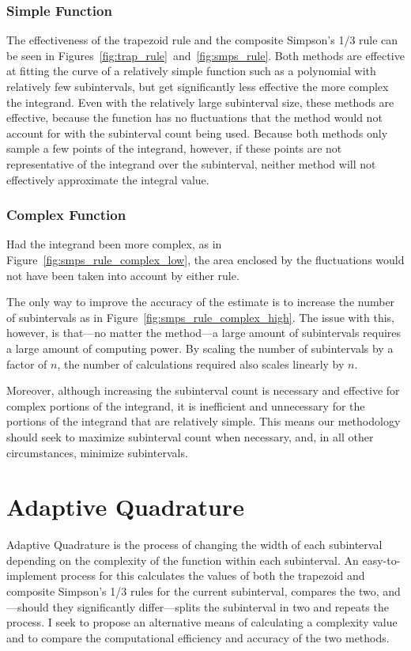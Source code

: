 \documentclass{paper}
\begin{document}
\subsubsection{Simple Function}
The effectiveness of the trapezoid rule and the composite Simpson's 1/3 rule can be seen in Figures~\ref{fig:trap_rule}~and~\ref{fig:smps_rule}.
Both methods are effective at fitting the curve of a relatively simple function such as a polynomial with relatively few subintervals, but get significantly less effective the more complex the integrand.
%
%
%
%
Even with the relatively large subinterval size, these methods are effective, because the function has no fluctuations that the method would not account for with the subinterval count being used.
Because both methods only sample a few points of the integrand, however, if these points are not representative of the integrand over the subinterval, neither method will not effectively approximate the integral value.

\subsubsection{Complex Function}
Had the integrand been more complex, as in Figure~\ref{fig:smps_rule_complex_low}, the area enclosed by the fluctuations would not have been taken into account by either rule.
%
%

%
The only way to improve the accuracy of the estimate is to increase the number of subintervals as in Figure~\ref{fig:smps_rule_complex_high}.
The issue with this, however, is that---no matter the method---a large amount of subintervals requires a large amount of computing power.
By scaling the number of subintervals by a factor of \(n\), the number of calculations required also scales linearly by \(n\).
%
%

%
Moreover, although increasing the subinterval count is necessary and effective for complex portions of the integrand, it is inefficient and unnecessary for the portions of the integrand that are relatively simple.
This means our methodology should seek to maximize subinterval count when necessary, and, in all other circumstances, minimize subintervals.

\section{Adaptive Quadrature}
Adaptive Quadrature is the process of changing the width of each subinterval depending on the complexity of the function within each subinterval.
An easy-to-implement process for this calculates the values of both the trapezoid and composite Simpson's 1/3 rules for the current subinterval, compares the two, and---should they significantly differ---splits the subinterval in two and repeats the process. %
I seek to propose an alternative means of calculating a complexity value and to compare the computational efficiency and accuracy of the two methods.
\end{document}
